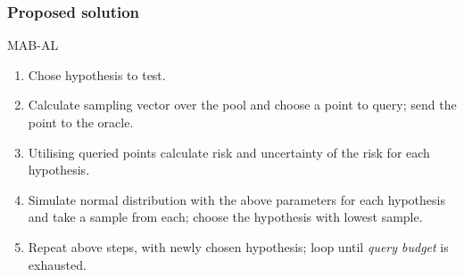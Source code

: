 \documentclass{beamer}
\begin{document}
  \begin{frame}
  \frametitle{Proposed solution}
    \begin{exampleblock}{MAB-AL}
      \begin{enumerate}
        \item Chose hypothesis to test.
        \item Calculate sampling vector over the pool and choose a point to query; send the point to the oracle.
        \item Utilising queried points calculate risk and uncertainty of the risk for each hypothesis.
        \item Simulate normal distribution with the above parameters for each hypothesis and take a sample from each; choose the hypothesis with lowest sample.
        \item Repeat above steps, with newly chosen hypothesis; loop until \emph{query budget} is exhausted.
      \end{enumerate}
    \end{exampleblock}
  \end{frame}
\end{document}
